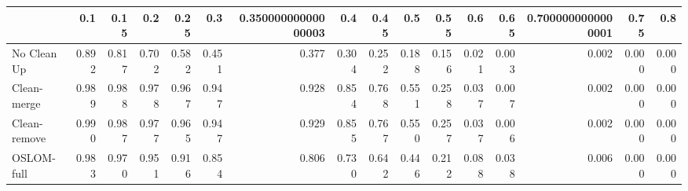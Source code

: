 \begin{tabular}{lrrrrrrrrrrrrrrr}
\toprule
{} &   0.1 &  0.15 &   0.2 &  0.25 &   0.3 & 0.35000000000000003 &   0.4 &  0.45 &   0.5 &  0.55 &   0.6 &  0.65 & 0.7000000000000001 &  0.75 &   0.8 \\
\midrule
No Clean Up  & 0.892 & 0.817 & 0.702 & 0.582 & 0.451 &               0.377 & 0.304 & 0.252 & 0.188 & 0.156 & 0.021 & 0.003 &              0.002 & 0.000 & 0.000 \\
Clean-merge  & 0.989 & 0.988 & 0.978 & 0.967 & 0.947 &               0.928 & 0.854 & 0.768 & 0.551 & 0.258 & 0.037 & 0.007 &              0.002 & 0.000 & 0.000 \\
Clean-remove & 0.990 & 0.987 & 0.977 & 0.965 & 0.947 &               0.929 & 0.855 & 0.767 & 0.550 & 0.257 & 0.037 & 0.006 &              0.002 & 0.000 & 0.000 \\
OSLOM-full   & 0.983 & 0.970 & 0.951 & 0.916 & 0.854 &               0.806 & 0.730 & 0.642 & 0.446 & 0.212 & 0.088 & 0.038 &              0.006 & 0.000 & 0.000 \\
\bottomrule
\end{tabular}
